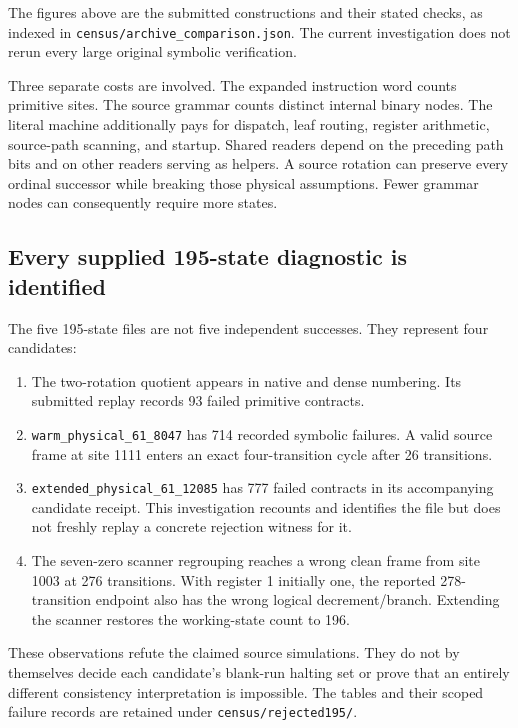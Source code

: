\documentclass[11pt,letterpaper]{article}
\newcommand{\file}[1]{\texttt{\nolinkurl{#1}}}
\begin{document}
The figures above are the submitted constructions and their stated checks,
as indexed in \file{census/archive_comparison.json}. The current investigation
does not rerun every large original symbolic verification.

Three separate costs are involved. The expanded instruction word counts
primitive sites. The source grammar counts distinct internal binary nodes.
The literal machine additionally pays for dispatch, leaf routing, register
arithmetic, source-path scanning, and startup. Shared readers depend on the
preceding path bits and on other readers serving as helpers. A source
rotation can preserve every ordinal successor while breaking those physical
assumptions. Fewer grammar nodes can consequently require more states.

\subsection{Every supplied 195-state diagnostic is identified}

The five 195-state files are not five independent successes. They represent
four candidates:

\begin{enumerate}
\item The two-rotation quotient appears in native and dense numbering. Its
submitted replay records 93 failed primitive contracts.
\item \file{warm_physical_61_8047} has 714 recorded symbolic failures. A valid
source frame at site 1111 enters an exact four-transition cycle after 26
transitions.
\item \file{extended_physical_61_12085} has 777 failed contracts in its
accompanying candidate receipt. This investigation recounts and identifies
the file but does not freshly replay a concrete rejection witness for it.
\item The seven-zero scanner regrouping reaches a wrong clean frame from
site 1003 at 276 transitions. With register 1 initially one, the reported
278-transition endpoint also has the wrong logical decrement/branch.
Extending the scanner restores the working-state count to 196.
\end{enumerate}

These observations refute the claimed source simulations. They do not by
themselves decide each candidate's blank-run halting set or prove that an
entirely different consistency interpretation is impossible. The tables and
their scoped failure records are retained under \file{census/rejected195/}.
\end{document}
